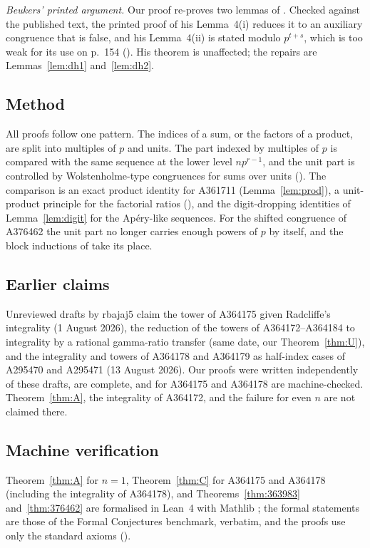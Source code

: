 \documentclass[11pt]{amsart}
\begin{document}
\emph{Beukers' printed argument.} Our proof re-proves two lemmas of \cite{beukers1985}. Checked against the published text, the printed proof of his Lemma~4(i) reduces it to an auxiliary congruence that is false, and his Lemma~4(ii) is stated modulo $p^{t+s}$, which is too weak for its use on p.~154 (). His theorem is unaffected; the repairs are Lemmas~\ref{lem:dh1} and~\ref{lem:dh2}.

\subsection*{Method} All proofs follow one pattern. The indices of a sum, or the factors of a product, are split into multiples of $p$ and units. The part indexed by multiples of $p$ is compared with the same sequence at the lower level $np^{r-1}$, and the unit part is controlled by Wolstenholme-type congruences for sums over units (). The comparison is an exact product identity for A361711 (Lemma~\ref{lem:prod}), a unit-product principle for the factorial ratios (), and the digit-dropping identities of Lemma~\ref{lem:digit} for the Ap\'ery-like sequences. For the shifted congruence of A376462 the unit part no longer carries enough powers of $p$ by itself, and the block inductions of  take its place.

\subsection*{Earlier claims} Unreviewed drafts by rbajaj5 \cite{rbajaj5} claim the tower of A364175 given Radcliffe's integrality (1 August 2026), the reduction of the towers of A364172--A364184 to integrality by a rational gamma-ratio transfer (same date, our Theorem~\ref{thm:U}), and the integrality and towers of A364178 and A364179 as half-index cases of A295470 and A295471 (13 August 2026). Our proofs were written independently of these drafts, are complete, and for A364175 and A364178 are machine-checked. Theorem~\ref{thm:A}, the integrality of A364172, and the failure for even $n$ are not claimed there.

\subsection*{Machine verification} Theorem~\ref{thm:A} for $n=1$, Theorem~\ref{thm:C} for A364175 and A364178 (including the integrality of A364178), and Theorems~\ref{thm:363983} and~\ref{thm:376462} are formalised in Lean~4 \cite{lean4} with Mathlib \cite{mathlib2020}; the formal statements are those of the Formal Conjectures benchmark, verbatim, and the proofs use only the standard axioms ().
\end{document}

